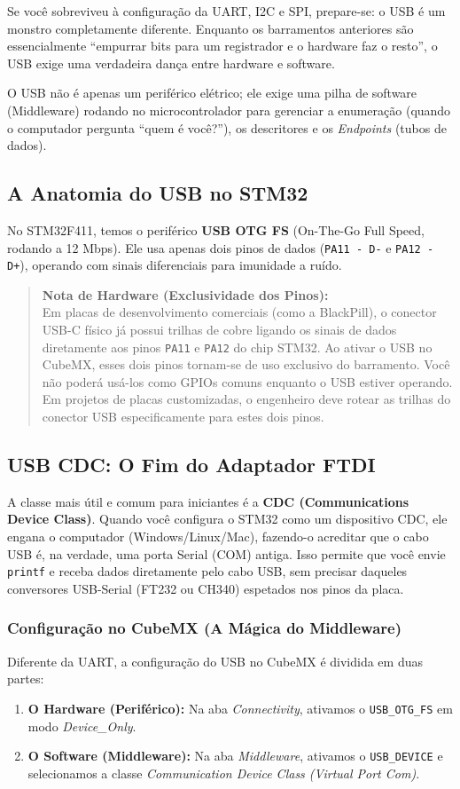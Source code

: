 \documentclass[12pt,a4paper]{article}
\begin{document}
Se você sobreviveu à configuração da UART, I2C e SPI, prepare-se: o USB é um monstro completamente diferente. Enquanto os barramentos anteriores são essencialmente ``empurrar bits para um registrador e o hardware faz o resto'', o USB exige uma verdadeira dança entre hardware e software.

O USB não é apenas um periférico elétrico; ele exige uma pilha de software (Middleware) rodando no microcontrolador para gerenciar a enumeração (quando o computador pergunta ``quem é você?''), os descritores e os \textit{Endpoints} (tubos de dados).



\subsection{A Anatomia do USB no STM32}
No STM32F411, temos o periférico \textbf{USB OTG FS} (On-The-Go Full Speed, rodando a 12 Mbps). Ele usa apenas dois pinos de dados (\texttt{PA11 - D-} e \texttt{PA12 - D+}), operando com sinais diferenciais para imunidade a ruído.
\begin{quote}
\textbf{Nota de Hardware (Exclusividade dos Pinos):} \\
Em placas de desenvolvimento comerciais (como a BlackPill), o conector USB-C físico já possui trilhas de cobre ligando os sinais de dados diretamente aos pinos \texttt{PA11} e \texttt{PA12} do chip STM32. Ao ativar o USB no CubeMX, esses dois pinos tornam-se de uso exclusivo do barramento. Você não poderá usá-los como GPIOs comuns enquanto o USB estiver operando. Em projetos de placas customizadas, o engenheiro deve rotear as trilhas do conector USB especificamente para estes dois pinos.
\end{quote}

\subsection{USB CDC: O Fim do Adaptador FTDI}
A classe mais útil e comum para iniciantes é a \textbf{CDC (Communications Device Class)}. Quando você configura o STM32 como um dispositivo CDC, ele engana o computador (Windows/Linux/Mac), fazendo-o acreditar que o cabo USB é, na verdade, uma porta Serial (COM) antiga. 
Isso permite que você envie \texttt{printf} e receba dados diretamente pelo cabo USB, sem precisar daqueles conversores USB-Serial (FT232 ou CH340) espetados nos pinos da placa.

\subsubsection{Configuração no CubeMX (A Mágica do Middleware)}
Diferente da UART, a configuração do USB no CubeMX é dividida em duas partes:
\begin{enumerate}
    \item \textbf{O Hardware (Periférico):} Na aba \textit{Connectivity}, ativamos o \texttt{USB\_OTG\_FS} em modo \textit{Device\_Only}.
    \item \textbf{O Software (Middleware):} Na aba \textit{Middleware}, ativamos o \texttt{USB\_DEVICE} e selecionamos a classe \textit{Communication Device Class (Virtual Port Com)}.
\end{enumerate}
\end{document}
